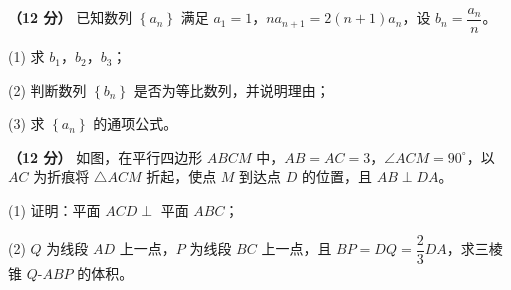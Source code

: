 \begin{question}
\textbf{（12 分）} 已知数列 $\left\{a_n\right\}$ 满足 $a_1=1$，$na_{n+1}=2(n+1)a_n$，设 $b_n=\dfrac{a_n}n$。

  (1) 求 $b_1$，$b_2$，$b_3$；

  (2) 判断数列 $\left\{b_n\right\}$ 是否为等比数列，并说明理由；

  (3) 求 $\left\{a_n\right\}$ 的通项公式。

\Needspace{0.4\textheight}
\end{question}
\begin{question}
\textbf{（12 分）} 如图，在平行四边形 $ABCM$ 中，$AB=AC=3$，$\angle ACM=90^\circ$，以 $AC$ 为折痕将 $\triangle ACM$ 折起，使点 $M$ 到达点 $D$ 的位置，且 $AB\perp DA$。
\nopagebreak[4]
\begin{center}\end{center}
\nopagebreak[4]
  (1) 证明：平面 $ACD\perp$ 平面 $ABC$；

  (2) $Q$ 为线段 $AD$ 上一点，$P$ 为线段 $BC$ 上一点，且 $BP=DQ=\dfrac23DA$，求三棱锥 $Q\text{-}ABP$ 的体积。

\Needspace{0.4\textheight}
\end{question}
